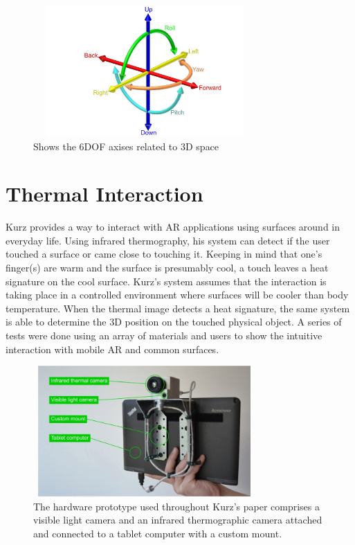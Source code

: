 \documentclass{sig-alternate}
\begin{document}
\begin{figure}
	\includegraphics[width=8.5cm, height=5cm]{6DOF_en}
	\caption{Shows the 6DOF axises related to 3D space \cite{6DOF}}
	\label{fig:6DOF}
\end{figure}  


\section{Thermal Interaction}
\label{sec:Thermal Interaction}
Kurz \cite{Thermal} provides a way to interact with AR applications using surfaces around in everyday life. Using infrared thermography, his system can detect if the user touched a surface or came close to touching it. Keeping in mind that one's finger(s) are warm and the surface is presumably cool, a touch leaves a heat signature on the cool surface. Kurz's system assumes that the interaction is taking place in a controlled environment where surfaces will be cooler than body temperature. When the thermal image detects a heat signature, the same system is able to determine the 3D position on the touched physical object. A series of tests were done using an array of materials and users to show the intuitive interaction with mobile AR and common surfaces. 

\begin{figure}
	\includegraphics[width=8.5cm, height=5cm]{Hardware2}
	\caption{The hardware prototype used throughout Kurz's paper comprises a visible light camera and an infrared thermographic camera attached and connected to a tablet computer with a custom mount. \cite{Thermal}}
	\label{fig:hardware}
\end{figure}
\end{document}
